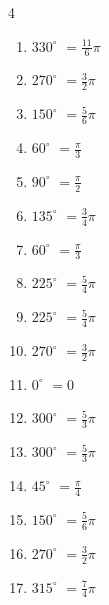 \begin{multicols}{4}
\begin{enumerate}
  \item $\displaystyle 330^{\circ}$
        $\displaystyle =\frac{11}{6}\pi$

  \item $\displaystyle 270^{\circ}$
        $\displaystyle =\frac{3}{2}\pi$

  \item $\displaystyle 150^{\circ}$
        $\displaystyle =\frac{5}{6}\pi$

  \item $\displaystyle 60^{\circ}$
        $\displaystyle =\frac{\pi}{3}$

  \item $\displaystyle 90^{\circ}$
        $\displaystyle =\frac{\pi}{2}$

  \item $\displaystyle 135^{\circ}$
        $\displaystyle =\frac{3}{4}\pi$

  \item $\displaystyle 60^{\circ}$
        $\displaystyle =\frac{\pi}{3}$

  \item $\displaystyle 225^{\circ}$
        $\displaystyle =\frac{5}{4}\pi$

  \item $\displaystyle 225^{\circ}$
        $\displaystyle =\frac{5}{4}\pi$

  \item $\displaystyle 270^{\circ}$
        $\displaystyle =\frac{3}{2}\pi$

  \item $\displaystyle 0^{\circ}$
        $\displaystyle =0$

  \item $\displaystyle 300^{\circ}$
        $\displaystyle =\frac{5}{3}\pi$

  \item $\displaystyle 300^{\circ}$
        $\displaystyle =\frac{5}{3}\pi$

  \item $\displaystyle 45^{\circ}$
        $\displaystyle =\frac{\pi}{4}$

  \item $\displaystyle 150^{\circ}$
        $\displaystyle =\frac{5}{6}\pi$

  \item $\displaystyle 270^{\circ}$
        $\displaystyle =\frac{3}{2}\pi$

\columnbreak %

  \item $\displaystyle 315^{\circ}$
        $\displaystyle =\frac{7}{4}\pi$


\end{enumerate}
\end{multicols}
